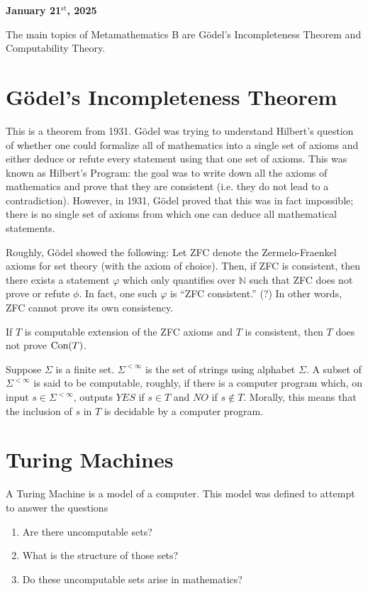 
\textbf{January 21$^{\text{st}}$, 2025}

The main topics of Metamathematics B are Gödel's Incompleteness Theorem and Computability Theory.

\section{Gödel's Incompleteness Theorem}
This is a theorem from 1931.
Gödel was trying to understand Hilbert's question of whether one could formalize all of mathematics into a single set of axioms and either deduce or refute every statement using that one set of axioms.
This was known as Hilbert's Program: the goal was to write down all the axioms of mathematics and prove that they are consistent (i.e. they do not lead to a contradiction).
However, in 1931, Gödel proved that this was in fact impossible;
there is no single set of axioms from which one can deduce all mathematical statements.

Roughly, Gödel showed the following:
Let ZFC denote the Zermelo-Fraenkel axioms for set theory (with the axiom of choice).
Then, if ZFC is consistent, then there exists a statement $\varphi$ which only quantifies over $\mathbb{N}$ such that ZFC does not prove or refute $\phi$.
In fact, one such $\varphi$ is ``ZFC consistent.'' (?)
In other words, ZFC cannot prove its own consistency.

If $T$ is computable extension of the ZFC axioms and $T$ is consistent, then $T$ does not prove $\text{Con}(T)$.

Suppose $\Sigma$ is a finite set.
$\Sigma^{< \infty}$ is the set of strings using alphabet $\Sigma$.
A subset of $\Sigma^{< \infty}$ is said to be computable, roughly, if
there is a computer program which, on input $s \in \Sigma^{< \infty}$, outputs $YES$ if $s \in T$ and $NO$ if $s \notin T$.
Morally, this means that the inclusion of $s$ in $T$ is decidable by a computer program.

\section{Turing Machines}
A Turing Machine is a model of a computer.
This model was defined to attempt to answer the questions
\begin{enumerate}
    \item Are there uncomputable sets?
    \item What is the structure of those sets?
    \item Do these uncomputable sets arise in mathematics?
\end{enumerate}

